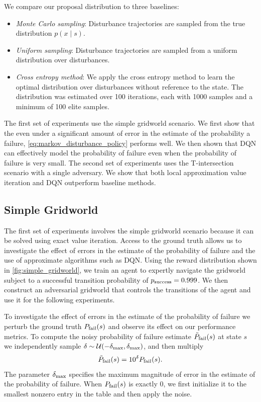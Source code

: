 We compare our proposal distribution to three baselines:
\begin{itemize}
    \item \emph{Monte Carlo sampling}: Disturbance trajectories are sampled from the true distribution $p(x \mid s)$.
    \item \emph{Uniform sampling}: Disturbance trajectories are sampled from a uniform distribution over disturbances. 
    \item \emph{Cross entropy method}: We apply the cross entropy method to learn the optimal distribution over disturbances without reference to the state. The distribution was estimated over \num{100} iterations, each with \num{1000} samples and a minimum of \num{100} elite samples.
\end{itemize}

The first set of experiments use the simple gridworld scenario. We first show that the even under a significant amount of error in the estimate of the probability a failure, \cref{eq:markov_disturbance_policy} performs well. We then shown that DQN can effectively model the probability of failure even when the probability of failure is very small. The second set of experiments uses the T-intersection scenario with a single adversary. We show that both local approximation value iteration and DQN outperform baseline methods. 

\subsection{Simple Gridworld}

The first set of experiments involves the simple gridworld scenario because it can be solved using exact value iteration. Access to the ground truth allows us to investigate the effect of errors in the estimate of the probability of failure and the use of approximate algorithms such as DQN. Using the reward distribution shown in \cref{fig:simple_gridworld}, we train an agent to expertly navigate the gridworld subject to a successful transition probability of $p_{\rm success} = 0.999$. We then construct an adversarial gridworld that controls the transitions of the agent and use it for the following experiments.

To investigate the effect of errors in the estimate of the probability of failure we perturb the ground truth $P_{\rm fail}(s)$ and observe its effect on our performance metrics. To compute the noisy probability of failure estimate $\tilde{P}_{\rm fail}(s)$ at state $s$ we independently sample $\delta \sim \mathcal{U}(-\delta_{\rm max}, \delta_{\rm max})$, and then multiply
\begin{equation}
    \tilde{P}_{\rm fail}(s) = 10^\delta P_{\rm fail}(s) \text{.}
\end{equation}
The parameter $\delta_{\rm max}$ specifies the maximum magnitude of error in the estimate of the probability of failure. When $P_{\rm fail}(s)$ is exactly \num{0}, we first initialize it to the smallest nonzero entry in the table and then apply the noise. 


